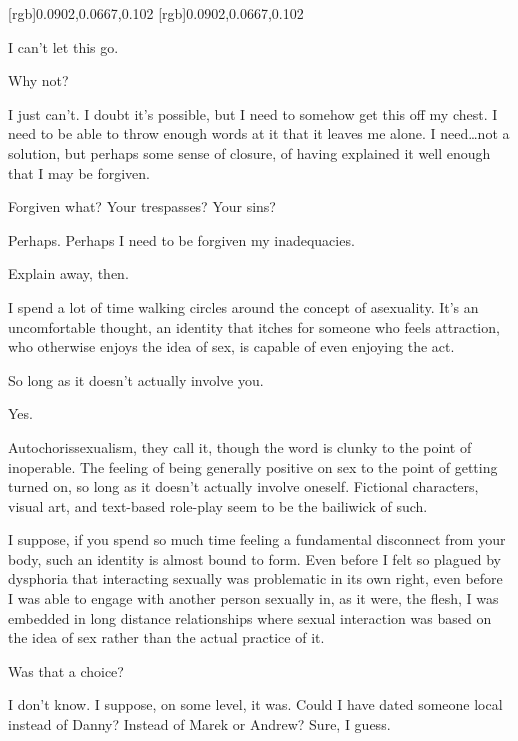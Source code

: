 [rgb]{0.0902,0.0667,0.102}
[rgb]{0.0902,0.0667,0.102}
\begin{paracol}{2}
\begin{rightcolumn*}

\end{rightcolumn*}
\begin{leftcolumn}
\noindent I can't let this go.

\begin{ally}
Why not?
\end{ally}
I just can't. I doubt it's possible, but I need to somehow get this off my chest. I need to be able to throw enough words at it that it leaves me alone. I need\ldots{}not a solution, but perhaps some sense of closure, of having explained it well enough that I may be forgiven.

\begin{ally}
Forgiven what? Your trespasses? Your sins?
\end{ally}
Perhaps. Perhaps I need to be forgiven my inadequacies.

\begin{ally}
Explain away, then.
\end{ally}
I spend a lot of time walking circles around the concept of asexuality. It's an uncomfortable thought, an identity that itches for someone who feels attraction, who otherwise enjoys the idea of sex, is capable of even enjoying the act.

\begin{ally}
So long as it doesn't actually involve you.
\end{ally}
Yes.

Autochorissexualism, they call it, though the word is clunky to the point of inoperable. The feeling of being generally positive on sex to the point of getting turned on, so long as it doesn't actually involve oneself. Fictional characters, visual art, and text-based role-play seem to be the bailiwick of such.

I suppose, if you spend so much time feeling a fundamental disconnect from your body, such an identity is almost bound to form. Even before I felt so plagued by dysphoria that interacting sexually was problematic in its own right, even before I was able to engage with another person sexually in, as it were, the flesh, I was embedded in long distance relationships where sexual interaction was based on the idea of sex rather than the actual practice of it.

\begin{ally}
Was that a choice?
\end{ally}
I don't know. I suppose, on some level, it was. Could I have dated someone local instead of Danny? Instead of Marek or Andrew? Sure, I guess.


\end{leftcolumn}
\end{paracol}
